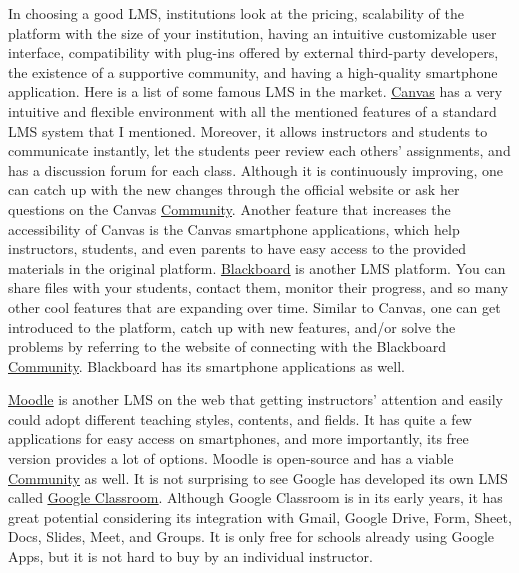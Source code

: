 \documentclass{book}
\begin{document}
In choosing a good LMS, institutions look at the pricing, scalability of the
platform with the size of your institution, having an intuitive customizable
user interface, compatibility with plug-ins offered by external third-party
developers, the existence of a supportive community, and having a high-quality
smartphone application. Here is a list of some famous LMS in the market.
\href{https://www.canvas.net/}{\underline{Canvas}} has a very intuitive and
flexible environment with all the mentioned features of a standard LMS system
that I mentioned. Moreover, it allows instructors and students to communicate
instantly, let the students peer review each others' assignments, and has a
discussion forum for each class. Although it is continuously improving, one
can catch up with the new changes through the official website or ask her
questions on the Canvas
\href{https://community.canvaslms.com/}{\underline{Community}}. Another
feature that increases the accessibility of Canvas is the Canvas smartphone
applications, which help instructors, students, and even parents to have easy
access to the provided materials in the original platform.
\href{https://www.blackboard.com/try}{\underline{Blackboard}} is another LMS
platform. You can share files with your students, contact them, monitor their
progress, and so many other cool features that are expanding over time.
Similar to Canvas, one can get introduced to the platform, catch up with new
features, and/or solve the problems by referring to the website of connecting
with the Blackboard
\href{https://community.blackboard.com/home}{\underline{Community}}.
Blackboard has its smartphone applications as well.

\href{https://learn.moodle.org/}{\underline{Moodle}} is another LMS on the web
that getting instructors' attention and easily could adopt different teaching
styles, contents, and fields. It has quite a few applications for easy access
on smartphones, and more importantly, its free version provides a lot of
options. Moodle is open-source and has a viable
\href{https://moodle.com/community/}{\underline{Community}} as well. It is not
surprising to see Google has developed its own LMS called
\href{https://edu.google.com/products/classroom/}{\underline{Google
Classroom}}. Although Google Classroom is in its early years, it has great
potential considering its integration with Gmail, Google Drive, Form, Sheet,
Docs, Slides, Meet, and Groups. It is only free for schools already using
Google Apps, but it is not hard to buy by an individual instructor.
\end{document}
